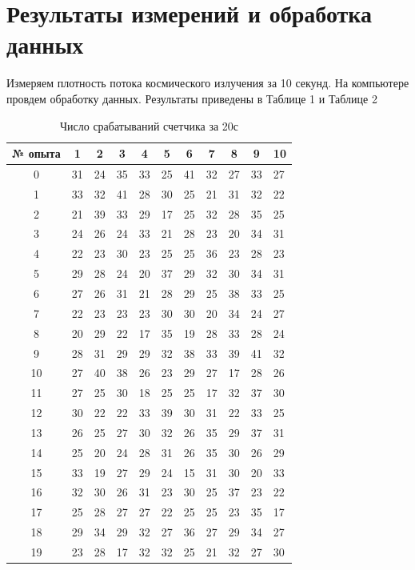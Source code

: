 \documentclass[a4paper,12pt]{article} %
\begin{document}
\section{Результаты измерений и обработка данных}
Измеряем плотность потока космического излучения за 10 секунд. На компьютере провдем обработку данных. Результаты приведены в Таблице 1 и Таблице 2
\newpage
\begin{table}[h]
\centering
\caption{Число срабатываний счетчика за 20с}
\label{table 1}
\renewcommand{\tabcolsep}{2mm}
\begin{tabular}{|c|l|l|l|l|l|l|l|l|l|l|}
\hline
№ опыта & \multicolumn{1}{c|}{1} & \multicolumn{1}{c|}{2} & \multicolumn{1}{c|}{3} & \multicolumn{1}{c|}{4} & \multicolumn{1}{c|}{5} & \multicolumn{1}{c|}{6} & \multicolumn{1}{c|}{7} & \multicolumn{1}{c|}{8} & \multicolumn{1}{c|}{9} & \multicolumn{1}{c|}{10} \\ \hline
0&31 & 24 & 35 & 33 & 25 & 41 & 32 & 27 & 33 & 27 \\ \hline
1&33 & 32 & 41 & 28 & 30 & 25 & 21 & 31 & 32 & 22 \\ \hline
2&21 & 39 & 33 & 29 & 17 & 25 & 32 & 28 & 35 & 25 \\ \hline
3&24 & 26 & 24 & 33 & 21 & 28 & 23 & 20 & 34 & 31 \\ \hline
4&22 & 23 & 30 & 23 & 25 & 25 & 36 & 23 & 28 & 23 \\ \hline
5&29 & 28 & 24 & 20 & 37 & 29 & 32 & 30 & 34 & 31 \\ \hline
6&27 & 26 & 31 & 21 & 28 & 29 & 25 & 38 & 33 & 25 \\ \hline
7&22 & 23 & 23 & 23 & 30 & 30 & 20 & 34 & 24 & 27 \\ \hline
8&20 & 29 & 22 & 17 & 35 & 19 & 28 & 33 & 28 & 24 \\ \hline
9&28 & 31 & 29 & 29 & 32 & 38 & 33 & 39 & 41 & 32 \\ \hline
10&27 & 40 & 38 & 26 & 23 & 29 & 27 & 17 & 28 & 26 \\ \hline
11&27 & 25 & 30 & 18 & 25 & 25 & 17 & 32 & 37 & 30 \\ \hline
12&30 & 22 & 22 & 33 & 39 & 30 & 31 & 22 & 33 & 25 \\ \hline
13&26 & 25 & 27 & 30 & 32 & 26 & 35 & 29 & 37 & 31 \\ \hline
14&25 & 20 & 24 & 28 & 31 & 26 & 35 & 30 & 26 & 29 \\ \hline
15&33 & 19 & 27 & 29 & 24 & 15 & 31 & 30 & 20 & 33 \\ \hline
16&32 & 30 & 26 & 31 & 23 & 30 & 25 & 37 & 23 & 22 \\ \hline
17&25 & 28 & 27 & 27 & 22 & 25 & 25 & 23 & 35 & 17 \\ \hline
18&29 & 34 & 29 & 32 & 27 & 36 & 27 & 29 & 34 & 27 \\ \hline
19&23 & 28 & 17 & 32 & 32 & 25 & 21 & 32 & 27 & 30 \\ \hline
\end{tabular}
\end{table}
\end{document}
